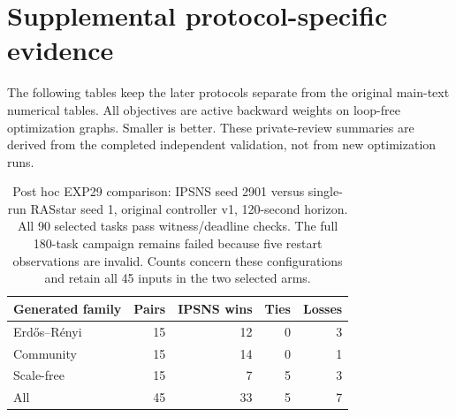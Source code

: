 \section{Supplemental protocol-specific evidence}\label{sec:supplement}
\setcounter{table}{0}
\renewcommand{\thetable}{S\arabic{table}}
\renewcommand{\theHtable}{S\arabic{table}}
The following tables keep the later protocols separate from the original main-text numerical tables. All objectives are active backward weights on loop-free optimization graphs. Smaller is better. These private-review summaries are derived from the completed independent validation, not from new optimization runs.

\begin{table}[htbp]
\caption{Post hoc EXP29 comparison: IPSNS seed 2901 versus single-run RASstar seed 1, original controller v1, 120-second horizon. All 90 selected tasks pass witness/deadline checks. The full 180-task campaign remains failed because five restart observations are invalid. Counts concern these configurations and retain all 45 inputs in the two selected arms.}\label{tab:s-exp29}
\centering\small
\begin{tabular}{lrrrr}\toprule
Generated family & Pairs & IPSNS wins & Ties & Losses\\\midrule
Erd\H{o}s--R\'enyi & 15 & 12 & 0 & 3\\
Community & 15 & 14 & 0 & 1\\
Scale-free & 15 & 7 & 5 & 3\\
\midrule All & 45 & 33 & 5 & 7\\\bottomrule
\end{tabular}
\end{table}

